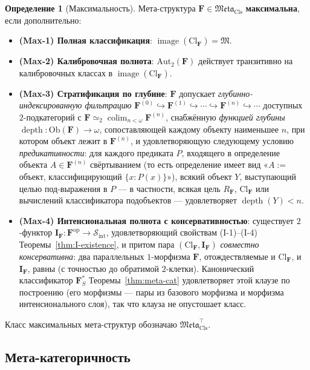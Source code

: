 \documentclass[11pt]{article}
\theoremstyle{plain}
\theoremstyle{definition}
\newtheorem{definition}[theorem]{Определение}
\newcommand{\cS}{\mathcal{S}}
\newcommand{\fM}{\mathfrak{M}}
\newcommand{\Meta}{\mathfrak{Meta}}
\newcommand{\Sint}{\cS_{\mathrm{int}}}
\newcommand{\Ob}{\mathrm{Ob}}
\newcommand{\Cl}{\mathrm{Cl}}
\newcommand{\II}{\mathbf{I}}
\DeclareMathOperator{\colim}{colim}
\DeclareMathOperator{\image}{image}
\DeclareMathOperator{\dep}{depth}
\begin{document}
\begin{definition}[Максимальность]\label{def:maximality}
Мета-структура $\mathbf{F} \in \Meta_{\mathrm{Cls}}$ \textbf{максимальна}, если дополнительно:
\begin{itemize}
\item \textbf{(Max-1) Полная классификация}: $\image(\Cl_{\mathbf{F}}) = \fM$.
\item \textbf{(Max-2) Калибровочная полнота}: $\mathrm{Aut}_2(\mathbf{F})$ действует транзитивно на калибровочных классах в $\image(\Cl_{\mathbf{F}})$.
\item \textbf{(Max-3) Стратификация по глубине}: $\mathbf{F}$ допускает \emph{глубинно-индексированную фильтрацию} $\mathbf{F}^{(0)} \hookrightarrow \mathbf{F}^{(1)} \hookrightarrow \cdots \hookrightarrow \mathbf{F}^{(n)} \hookrightarrow \cdots$ доступных $2$-подкатегорий с $\mathbf{F} \simeq_2 \colim_{n < \omega} \mathbf{F}^{(n)}$, снабжённую \emph{функцией глубины} $\dep : \Ob(\mathbf{F}) \to \omega$, сопоставляющей каждому объекту наименьшее $n$, при котором объект лежит в $\mathbf{F}^{(n)}$, и удовлетворяющую следующему условию \emph{предикативности}: для каждого предиката $P$, входящего в определение объекта $A \in \mathbf{F}^{(n)}$ свёртыванием (то есть определение имеет вид «$A :=$ объект, классифицирующий $\{x : P(x)\}$»), всякий объект $Y$, выступающий целью под-выражения в $P$ --- в частности, всякая цель $R_\mathbf{F}$, $\Cl_\mathbf{F}$ или вычислений классификатора подобъектов --- удовлетворяет $\dep(Y) < n$.
\item \textbf{(Max-4) Интенсиональная полнота с консервативностью}: существует $2$-функтор $\II_{\mathbf{F}} : \mathbf{F}^{\mathrm{op}} \to \Sint$, удовлетворяющий свойствам (I-1)--(I-4) Теоремы~\ref{thm:I-existence}, и притом пара $(\Cl_{\mathbf{F}}, \II_{\mathbf{F}})$ \emph{совместно консервативна}: два параллельных $1$-морфизма $\mathbf{F}$, отождествляемые и $\Cl_{\mathbf{F}}$, и $\II_{\mathbf{F}}$, равны (с точностью до обратимой $2$-клетки). Канонический классификатор $\mathbf{F}_S^*$ Теоремы~\ref{thm:meta-cat} удовлетворяет этой клаузе по построению (его морфизмы — пары из базового морфизма и морфизма интенсионального слоя), так что клауза не опустошает класс.
\end{itemize}
Класс максимальных мета-структур обозначаю $\Meta_{\mathrm{Cls}}^{\top}$.
\end{definition}

\subsection{Мета-категоричность}
\end{document}
